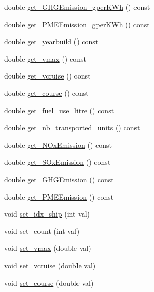 \begin{DoxyCompactItemize}
\item 
double \mbox{\hyperlink{class_ship_a80885b4891a72f091848642fee017054}{get\+\_\+\+G\+H\+G\+Emission\+\_\+gper\+K\+Wh}} () const
\item 
double \mbox{\hyperlink{class_ship_a34ec4da6b3f3494592ce0fb67d24c09c}{get\+\_\+\+P\+M\+E\+Emission\+\_\+gper\+K\+Wh}} () const
\item 
double \mbox{\hyperlink{class_ship_add2c961edae22bc6590dde7289e158b8}{get\+\_\+yearbuild}} () const
\item 
double \mbox{\hyperlink{class_ship_a18d96c836dffd4e9bb756014e0469bee}{get\+\_\+vmax}} () const
\item 
double \mbox{\hyperlink{class_ship_a4eb1d4b2502b0aa5a5d4d18fbcdb4af0}{get\+\_\+vcruise}} () const
\item 
double \mbox{\hyperlink{class_ship_abe76a5439f140ce8c8819bcdebe6d2a8}{get\+\_\+course}} () const
\item 
double \mbox{\hyperlink{class_ship_a3341ae3493ea474573cef1ee4050c06a}{get\+\_\+fuel\+\_\+use\+\_\+litre}} () const
\item 
double \mbox{\hyperlink{class_ship_a51334458c7e56cfd6fb64340dced977c}{get\+\_\+nb\+\_\+transported\+\_\+units}} () const
\item 
double \mbox{\hyperlink{class_ship_aed6705dc37c07d1ca009ba2b9ca4a150}{get\+\_\+\+N\+Ox\+Emission}} () const
\item 
double \mbox{\hyperlink{class_ship_a07c4f505be69cf3093bbdafa00131dcc}{get\+\_\+\+S\+Ox\+Emission}} () const
\item 
double \mbox{\hyperlink{class_ship_af556bb0ce92e950e16eec928f3d18300}{get\+\_\+\+G\+H\+G\+Emission}} () const
\item 
double \mbox{\hyperlink{class_ship_ab626df07c2a45cc09fa7b3c98e8e2a9c}{get\+\_\+\+P\+M\+E\+Emission}} () const
\item 
void \mbox{\hyperlink{class_ship_a1fb49123ca111896ee2e61f15e106bd6}{set\+\_\+idx\+\_\+ship}} (int val)
\item 
void \mbox{\hyperlink{class_ship_a6233340d0e09dcc5518572538a2042d5}{set\+\_\+count}} (int val)
\item 
void \mbox{\hyperlink{class_ship_aa8cac550988f1bb1ce13cb5420860bd6}{set\+\_\+vmax}} (double val)
\item 
void \mbox{\hyperlink{class_ship_a6bf88532d109acb4bad7540a5d28a38f}{set\+\_\+vcruise}} (double val)
\item 
void \mbox{\hyperlink{class_ship_a655322cd5330201cfe7e52505a51a1bf}{set\+\_\+course}} (double val)

\end{DoxyCompactItemize}
